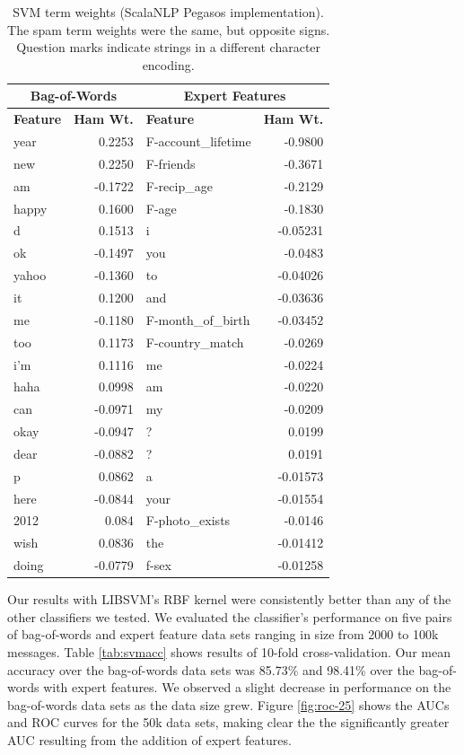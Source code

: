 \documentclass[preprint]{acm_proc_article-sp}
\begin{document}
\begin{table}
\begin{tabular}{l|r||l|r}
\multicolumn{2}{c}{\textbf{Bag-of-Words}} & 
\multicolumn{2}{c}{\textbf{Expert Features}} \\
\hline
\textbf{Feature} & \textbf{Ham Wt.} & \textbf{Feature} & \textbf{Ham Wt.} \\
\hline

year & 0.2253 & F-account\_lifetime & -0.9800\\
new & 0.2250 & F-friends & -0.3671\\
am & -0.1722 & F-recip\_age & -0.2129\\
happy & 0.1600 & F-age & -0.1830\\
d & 0.1513 & i & -0.05231\\
ok & -0.1497 & you & -0.0483\\
yahoo & -0.1360 & to & -0.04026\\
it & 0.1200 & and & -0.03636\\
me & -0.1180 & F-month\_of\_birth & -0.03452\\
too & 0.1173 & F-country\_match & -0.0269\\
i'm & 0.1116 & me & -0.0224\\
haha & 0.0998 & am & -0.0220\\
can & -0.0971 & my & -0.0209\\
okay & -0.0947 & ? & 0.0199\\
dear & -0.0882 & ? & 0.0191\\
p & 0.0862 & a & -0.01573\\
here & -0.0844 & your & -0.01554\\
2012 & 0.084 & F-photo\_exists & -0.0146\\
wish & 0.0836 & the & -0.01412\\
doing & -0.0779 & f-sex & -0.01258\\

\end{tabular}
\caption{SVM term weights (ScalaNLP Pegasos implementation). The spam term weights were the same, but opposite signs.
Question marks indicate strings in a different character encoding.}
\label{tab:svmfeats}
\end{table}

Our results with LIBSVM's RBF kernel were consistently better than any of the other classifiers we tested. We 
evaluated the classifier's performance on five pairs of bag-of-words and expert feature data sets ranging in 
size from 2000 to 100k messages. Table \ref{tab:svmacc} shows results of 10-fold cross-validation. Our mean 
accuracy over the bag-of-words data sets was 85.73\% and 98.41\% over the bag-of-words with expert features. We 
observed a slight decrease in performance on the bag-of-words data sets as the data size grew. Figure \ref{fig:roc-25}
shows the AUCs and ROC curves for the 50k data sets, making clear the the significantly greater AUC resulting 
from the addition of expert features.
\end{document}
